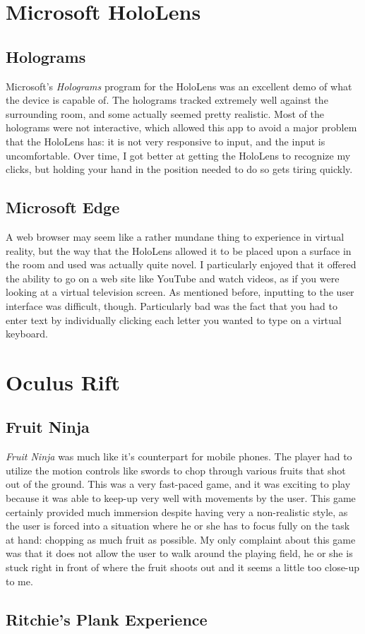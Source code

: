 \documentclass[11pt]{article}
\begin{document}
\section{Microsoft HoloLens}
\subsection{Holograms}
Microsoft's \textit{Holograms} program for the HoloLens was an excellent demo of what the 
device is capable of. The holograms tracked extremely well against the surrounding room,
and some actually seemed pretty realistic. Most of the holograms were not interactive,
which allowed this app to avoid a major problem that the HoloLens has: it is not very
responsive to input, and the input is uncomfortable. Over time, I got better at getting
the HoloLens to recognize my clicks, but holding your hand in the position needed to do so
gets tiring quickly.
\subsection{Microsoft Edge}
A web browser may seem like a rather mundane thing to experience in virtual reality, but
the way that the HoloLens allowed it to be placed upon a surface in the room and used was
actually quite novel. I particularly enjoyed that it offered the ability to go on a web
site like YouTube and watch videos, as if you were looking at a virtual television
screen. As mentioned before, inputting to the user interface was difficult, though.
Particularly bad was the fact that you had to enter text by individually clicking each
letter you wanted to type on a virtual keyboard.
\section{Oculus Rift}
\subsection{Fruit Ninja}
\textit{Fruit Ninja} was much like it's counterpart for mobile phones. The player had to
utilize the motion controls like swords to chop through various fruits that shot out of
the ground. This was a very fast-paced game, and it was exciting to play because it
was able to keep-up very well with movements by the user. This game certainly provided
much immersion despite having very a non-realistic style, as the user is forced into a
situation where he or she has to focus fully on the task at hand: chopping as much fruit
as possible. My only complaint about this game was that it does not allow the user to walk
around the playing field, he or she is stuck right in front of where the fruit shoots out
and it seems a little too close-up to me.
\subsection{Ritchie's Plank Experience}
\end{document}
